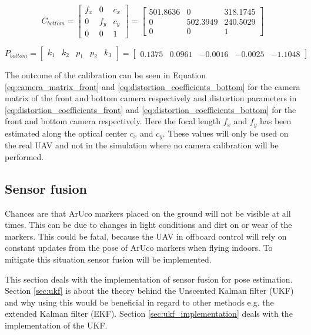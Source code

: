 \documentclass[../Head/report.tex]{subfiles}
\begin{document}
\begin{equation}
C_{bottom}  = 
\begin{bmatrix}
f_x & 0 & c_x\\
0 & f_y & c_y\\
0 & 0 & 1
\end{bmatrix}
=
\begin{bmatrix}
501.8636 & 0 & 318.1745\\
0 & 502.3949 & 240.5029\\
0 & 0 & 1
\end{bmatrix}
\label{eq:camera_matrix_bottom}
\end{equation}

\begin{equation}
P_{bottom} =
\begin{bmatrix}
k_1 & k_2 & p_1 & p_2 & k_3
\end{bmatrix}
=
\begin{bmatrix}
0.1375 & 0.0961 & -0.0016 & -0.0025 & -1.1048
\end{bmatrix}
\label{eq:distortion_coefficients_bottom}
\end{equation}

The outcome of the calibration can be seen in Equation \ref{eq:camera_matrix_front} and \ref{eq:distortion_coefficients_bottom} for the camera matrix of the front and bottom camera respectively and distortion parameters in \ref{eq:distortion_coefficients_front} and \ref{eq:distortion_coefficients_bottom} for the front and bottom camera respectively. Here the focal length $f_x$ and $f_y$ has been estimated along the optical center $c_x$ and $c_y$. These values will only be used on the real UAV and not in the simulation where no camera calibration will be performed. 


\subsection{Sensor fusion}
\label{sec:sensor_fusion}
Chances are that ArUco markers placed on the ground will not be visible at all times. This can be due to changes in light conditions and dirt on or wear of the markers. This could be fatal, because the UAV in offboard control will rely on constant updates from the pose of ArUco markers when flying indoors. To mitigate this situation sensor fusion will be implemented. 

This section deals with the implementation of sensor fusion for pose estimation. Section \ref{sec:ukf} is about the theory behind the Unscented Kalman filter (UKF) and why using this would be beneficial in regard to other methods e.g. the extended Kalman filter (EKF). Section \ref{sec:ukf_implementation} deals with the implementation of the UKF.   
\end{document}
